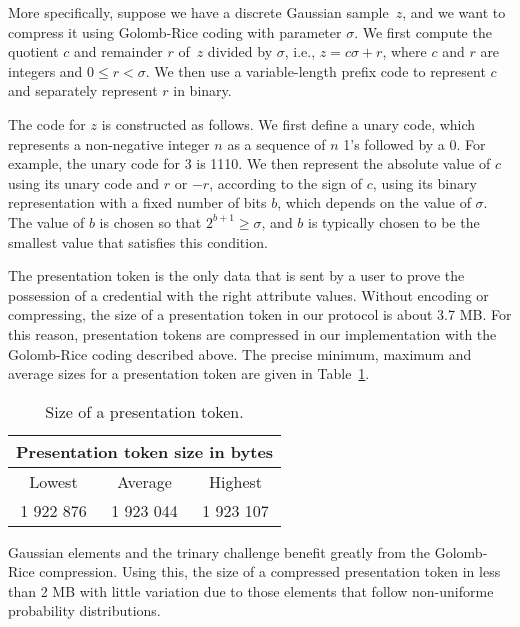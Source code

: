 More specifically, suppose we have a discrete Gaussian sample~$z$, and we want to compress it using Golomb-Rice coding with parameter $\sigma$. We first compute the quotient $c$ and remainder $r$ of~$z$ divided by $\sigma$, i.e., $z = c\sigma + r$, where $c$ and $r$ are integers and $0 \leq r < \sigma$. We then use a variable-length prefix code to represent $c$ and separately represent $r$ in binary.

The code for $z$ is constructed as follows. We first define a unary code, which represents a non-negative integer $n$ as a sequence of $n$ 1's followed by a 0. For example, the unary code for 3 is 1110. We then represent the absolute value of $c$ using its unary code and $r$ or $-r$, according to the sign of $c$, using its binary representation with a fixed number of bits $b$, which depends on the value of $\sigma$. The value of $b$ is chosen so that $2^{b+1} \geq \sigma$, and $b$ is typically chosen to be the smallest value that satisfies this condition.

The presentation token is the only data that is sent by a user to prove the possession of a credential with the right attribute values. Without encoding or compressing, the size of a presentation token in our protocol is about 3.7 MB. For this reason, presentation tokens are compressed in our implementation with the Golomb-Rice coding described above. The precise minimum, maximum and average sizes for a presentation token are given in Table~\ref{tab:size}.

\begin{table}[!ht]
\centering
\caption{Size of a presentation token.}
\label{tab:size}
\begin{tabular}{ccc}
\toprule
\multicolumn{3}{c}{\textbf{Presentation token size in bytes}} \\
\midrule
 Lowest & Average & Highest \\
\midrule
1 922 876 & 1 923 044 & 1 923 107 \\
\bottomrule
\end{tabular}
\end{table}

\vspace*{-4mm} %


Gaussian elements and the trinary challenge benefit greatly from the Golomb-Rice compression. Using this, the size of a compressed presentation token in less than 2 MB with little variation due to those elements that follow non-uniforme probability distributions.

